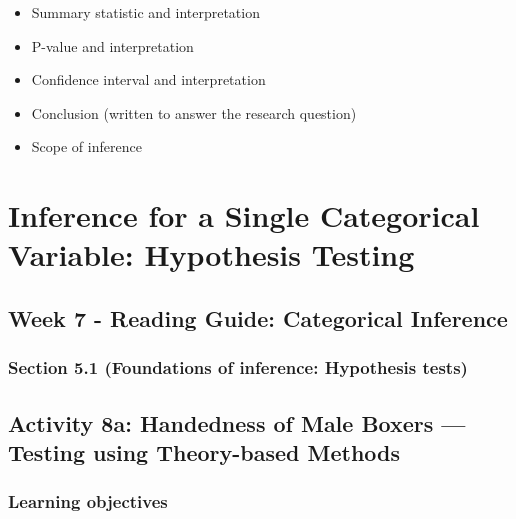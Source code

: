 \documentclass[
]{report}
\begin{document}
\begin{itemize}
\item
  Summary statistic and interpretation
\item
  P-value and interpretation
\item
  Confidence interval and interpretation
\item
  Conclusion (written to answer the research question)
\item
  Scope of inference
\end{itemize}

\newpage

\hypertarget{inference-for-a-single-categorical-variable-hypothesis-testing-1}{%
\chapter{Inference for a Single Categorical Variable: Hypothesis Testing}\label{inference-for-a-single-categorical-variable-hypothesis-testing-1}}

\hypertarget{week-7---reading-guide-categorical-inference-1}{%
\section{Week 7 - Reading Guide: Categorical Inference}\label{week-7---reading-guide-categorical-inference-1}}

\hypertarget{section-5.1-foundations-of-inference-hypothesis-tests-1}{%
\subsection*{Section 5.1 (Foundations of inference: Hypothesis tests)}\label{section-5.1-foundations-of-inference-hypothesis-tests-1}}

\newpage

\hypertarget{activity-8a-handedness-of-male-boxers-testing-using-theory-based-methods}{%
\section{Activity 8a: Handedness of Male Boxers --- Testing using Theory-based Methods}\label{activity-8a-handedness-of-male-boxers-testing-using-theory-based-methods}}


\hypertarget{learning-objectives-9}{%
\subsection{Learning objectives}\label{learning-objectives-9}}
\end{document}
